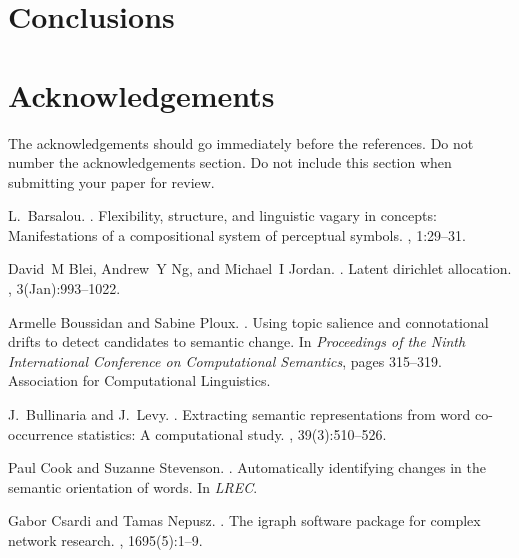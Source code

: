 \documentclass[11pt]{article}
\begin{document}
\section{Conclusions}
\label{conclusions}

\section*{Acknowledgements}

The acknowledgements should go immediately before the references.  Do
not number the acknowledgements section. Do not include this section
when submitting your paper for review.





\begin{thebibliography}{}

L.~Barsalou.
.
\newblock Flexibility, structure, and linguistic vagary in concepts:
  Manifestations of a compositional system of perceptual symbols.
, 1:29--31.

David~M Blei, Andrew~Y Ng, and Michael~I Jordan.
.
\newblock Latent dirichlet allocation.
, 3(Jan):993--1022.

Armelle Boussidan and Sabine Ploux.
.
\newblock Using topic salience and connotational drifts to detect candidates to
  semantic change.
\newblock In {\em Proceedings of the Ninth International Conference on
  Computational Semantics}, pages 315--319. Association for Computational
  Linguistics.

J.~Bullinaria and J.~Levy.
.
\newblock Extracting semantic representations from word co-occurrence
  statistics: A computational study.
, 39(3):510--526.

Paul Cook and Suzanne Stevenson.
.
\newblock Automatically identifying changes in the semantic orientation of
  words.
\newblock In {\em LREC}.

Gabor Csardi and Tamas Nepusz.
.
\newblock The igraph software package for complex network research.
, 1695(5):1--9.


\end{thebibliography}
\end{document}
